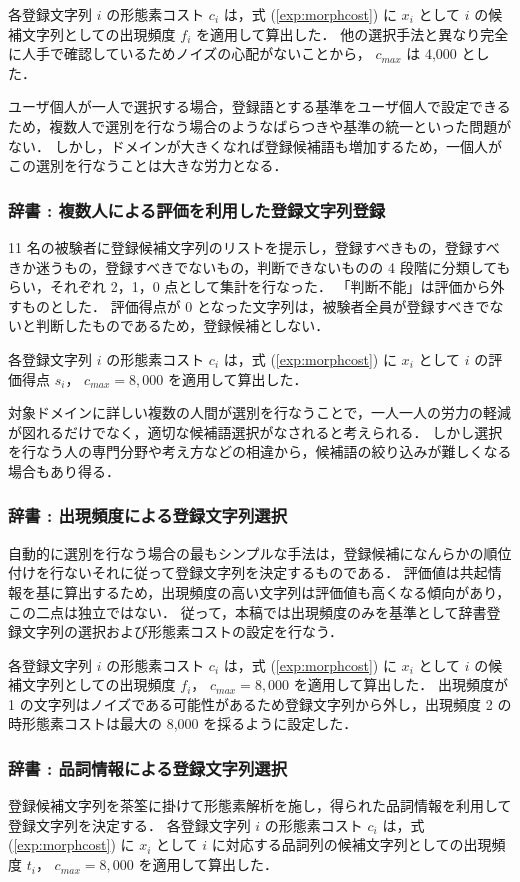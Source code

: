 各登録文字列 $i$ の形態素コスト $c_i$ は，式 (\ref{exp:morphcost}) に $x_i$ として $i$ の候補文字列としての出現頻度 $f_i$ を適用して算出した．
他の選択手法と異なり完全に人手で確認しているためノイズの心配がないことから， $c_{max}$ は 4,000 とした．

ユーザ個人が一人で選択する場合，登録語とする基準をユーザ個人で設定できるため，複数人で選別を行なう場合のようなばらつきや基準の統一といった問題がない．
しかし，ドメインが大きくなれば登録候補語も増加するため，一個人がこの選別を行なうことは大きな労力となる．
\subsubsection{辞書 \chk: 複数人による評価を利用した登録文字列登録}
\label{sec:whatischk}
11 名の被験者に登録候補文字列のリストを提示し，登録すべきもの，登録すべきか迷うもの，登録すべきでないもの，判断できないものの  4 段階に分類してもらい，それぞれ 2，1，0 点として集計を行なった．
「判断不能」は評価から外すものとした．
評価得点が 0 となった文字列は，被験者全員が登録すべきでないと判断したものであるため，登録候補としない．

各登録文字列 $i$ の形態素コスト $c_i$ は，式 (\ref{exp:morphcost}) に $x_i$ として $i$ の評価得点 $s_i$， $c_{max} = 8,000$ を適用して算出した．

対象ドメインに詳しい複数の人間が選別を行なうことで，一人一人の労力の軽減が図れるだけでなく，適切な候補語選択がなされると考えられる．
しかし選択を行なう人の専門分野や考え方などの相違から，候補語の絞り込みが難しくなる場合もあり得る．
\subsubsection{辞書 \frq: 出現頻度による登録文字列選択}
\label{sec:whatisfrq}
自動的に選別を行なう場合の最もシンプルな手法は，登録候補になんらかの順位付けを行ないそれに従って登録文字列を決定するものである．
評価値は共起情報を基に算出するため，出現頻度の高い文字列は評価値も高くなる傾向があり，この二点は独立ではない．
従って，本稿では出現頻度のみを基準として辞書登録文字列の選択および形態素コストの設定を行なう．

各登録文字列 $i$ の形態素コスト $c_i$ は，式 (\ref{exp:morphcost}) に $x_i$ として $i$ の候補文字列としての出現頻度 $f_i$， $c_{max} = 8,000$ を適用して算出した．
出現頻度が 1 の文字列はノイズである可能性があるため登録文字列から外し，出現頻度 2 の時形態素コストは最大の 8,000 を採るように設定した．
\subsubsection{辞書 \pos: 品詞情報による登録文字列選択}
\label{sec:whatispos}
登録候補文字列を茶筌に掛けて形態素解析を施し，得られた品詞情報を利用して登録文字列を決定する．
各登録文字列 $i$ の形態素コスト $c_i$ は，式 (\ref{exp:morphcost}) に $x_i$ として $i$ に対応する品詞列の候補文字列としての出現頻度 $t_i$， $c_{max} = 8,000$ を適用して算出した．
